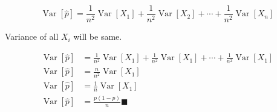 \documentclass{article}
\theoremstyle{mytheoremstyle}
\theoremstyle{mytheoremstyle}
\theoremstyle{myproblemstyle}
\begin{document}
\[\operatorname{Var}[\hat{p}]=\frac{1}{n^2}\operatorname{Var}[X_1]+\frac{1}{n^2}\operatorname{Var}[X_2]+\cdots+\frac{1}{n^2}\operatorname{Var}[X_n]\]

Variance of all \(X_i\) will be same.

\begin{equation}
	\begin{split}
		\operatorname{Var}[\hat{p}]&=\frac{1}{n^2}\operatorname{Var}[X_1]+\frac{1}{n^2}\operatorname{Var}[X_1]+\cdots+\frac{1}{n^2}\operatorname{Var}[X_1]\\
		\operatorname{Var}[\hat{p}]&=\frac{n}{n^2}\operatorname{Var}[X_1]\\
		\operatorname{Var}[\hat{p}]&=\frac{1}{n}\operatorname{Var}[X_1]\\
		\operatorname{Var}[\hat{p}]&=\frac{p(1-p)}{n}\blacksquare
	\end{split}
\end{equation}
\end{document}
